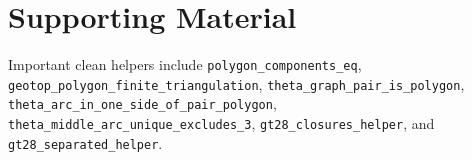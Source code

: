 \documentclass{article}
\begin{document}
\section*{Supporting Material}

Important clean helpers include \texttt{polygon\_components\_eq},
\texttt{geotop\_polygon\_finite\_triangulation},
\texttt{theta\_graph\_pair\_is\_polygon},
\texttt{theta\_arc\_in\_one\_side\_of\_pair\_polygon},
\texttt{theta\_middle\_arc\_unique\_excludes\_3},
\texttt{gt28\_closures\_helper}, and \texttt{gt28\_separated\_helper}.
\end{document}
